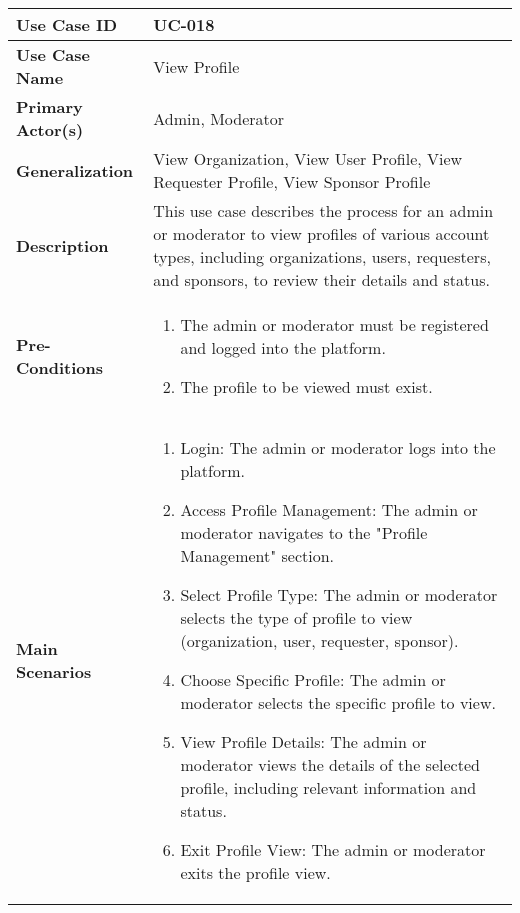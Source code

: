 \begin{table}[!ht]
    \centering
    \renewcommand{\arraystretch}{1.3} %
    \begin{tabularx}{\textwidth}{|l|X|}
        \hline
        \textbf{Use Case ID} & UC-018 \\
        \hline
        \textbf{Use Case Name} & View Profile \\
        \hline
        \textbf{Primary Actor(s)} & Admin, Moderator \\
        \hline
        \textbf{Generalization} & View Organization, View User Profile, View Requester Profile, View Sponsor Profile \\
        \hline
        \textbf{Description} & This use case describes the process for an admin or moderator to view profiles of various account types, including organizations, users, requesters, and sponsors, to review their details and status. \\
        \hline
        \textbf{Pre-Conditions} & 
        \begin{enumerate}[label=\arabic*.,itemsep=0pt]
            \item The admin or moderator must be registered and logged into the platform.
            \item The profile to be viewed must exist.
        \end{enumerate} \\
        \hline
        \textbf{Main Scenarios} & 
        \begin{enumerate}[label=\arabic*.,itemsep=0pt]
            \item Login: The admin or moderator logs into the platform.
            \item Access Profile Management: The admin or moderator navigates to the "Profile Management" section.
            \item Select Profile Type: The admin or moderator selects the type of profile to view (organization, user, requester, sponsor).
            \item Choose Specific Profile: The admin or moderator selects the specific profile to view.
            \item View Profile Details: The admin or moderator views the details of the selected profile, including relevant information and status.
            \item Exit Profile View: The admin or moderator exits the profile view.
        \end{enumerate} \\

\end{tabularx}
\end{table}
